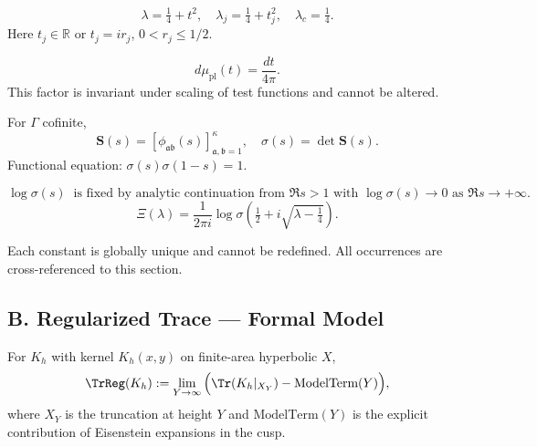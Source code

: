 \begin{definition}\label{def:spec-param-v4}
\[
  \lambda = \tfrac14+t^2,\quad 
  \lambda_j=\tfrac14+t_j^2,\quad 
  \lambda_c=\tfrac14.
\]
Here $t_j \in \mathbb R$ or $t_j=ir_j$, $0<r_j\le 1/2$.
\end{definition}

\begin{definition}\label{def:plancherel-v4}
\[
  d\mu_{\mathrm{pl}}(t)=\frac{dt}{4\pi}.
\]
This factor is invariant under scaling of test functions and cannot be altered.
\end{definition}

\begin{definition}\label{def:scattering-v4}
For $\Gamma$ cofinite,
\[
  \mathbf S(s) = [\phi_{\mathfrak a \mathfrak b}(s)]_{\mathfrak a,\mathfrak b=1}^\kappa,\quad 
  \sigma(s) = \det \mathbf S(s).
\]
Functional equation: $\sigma(s)\sigma(1-s)=1$.
\end{definition}

\begin{definition}\label{def:branch-v4}
\[
  \log \sigma(s)\;\;\text{is fixed by analytic continuation from $\Re s>1$ with $\log\sigma(s)\to 0$ as $\Re s\to+\infty$.}
\]
\[
  \Xi(\lambda) = \frac{1}{2\pi i} \log \sigma\!\left(\tfrac12+i\sqrt{\lambda-\tfrac14}\right).
\]
\end{definition}

\begin{remark}\label{rem:ledger-v4}
Each constant is globally unique and cannot be redefined. All occurrences are cross-referenced to this section.
\end{remark}


\subsection*{B. Regularized Trace — Formal Model}

\begin{definition}\label{def:reg-trace-v4}
For $K_h$ with kernel $K_h(x,y)$ on finite-area hyperbolic $X$,
\[
  \TrReg(K_h) := \lim_{Y\to\infty} \Big( \Tr(K_h|_{X_Y}) - \text{ModelTerm}(Y)\Big),
\]
where $X_Y$ is the truncation at height $Y$ and $\text{ModelTerm}(Y)$ is the explicit contribution of Eisenstein expansions in the cusp.
\end{definition}

